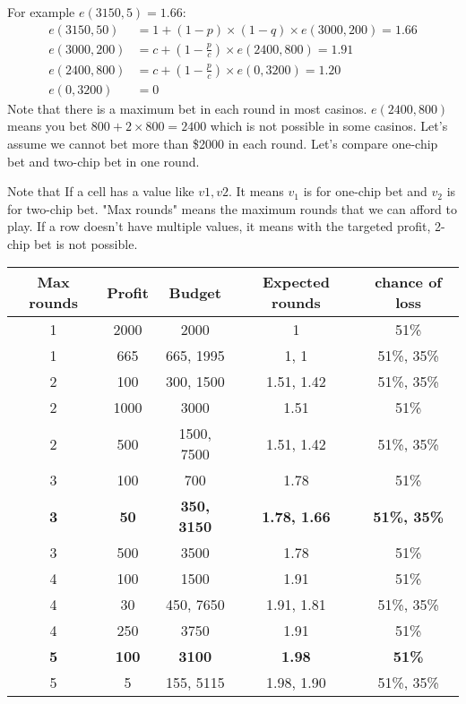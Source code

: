 \documentclass{book}
\begin{document}
	For example $e(3150, 5) = 1.66$:
	\begin{equation*}
		\begin{split}
			e(3150, 50) &= 1 + (1 - p) \times (1 - q) \times e(3000, 200) = 1.66 \\
			e(3000, 200) &= c + (1 - \frac{p}{c}) \times e(2400, 800) = 1.91 \\
			e(2400, 800) &= c + (1 - \frac{p}{c}) \times e(0, 3200) = 1.20 \\
			e(0, 3200) &= 0
		\end{split}
	\end{equation*}
	Note that there is a maximum bet in each round in most casinos. $e(2400, 800)$ means you bet $800 + 2 \times 800 = 2400$ which is not possible in some casinos. Let's assume we cannot bet more than \$2000 in each round. Let's compare one-chip bet and two-chip bet in one round.
	\par Note that If a cell has a value like $v1, v2$. It means $v_1$ is for one-chip bet and $v_2$ is for two-chip bet. "Max rounds" means the maximum rounds that we can afford to play. If a row doesn't have multiple values, it means with the targeted profit, 2-chip bet is not possible. \\
	\begin{tabular}[h!]{c c c c c}
		\toprule
		Max rounds & Profit & Budget & Expected rounds & chance of loss \\
		\midrule
		1 & 2000 & 2000 & 1 & 51\% \\
		1 & 665 & 665, 1995 & 1, 1 & 51\%, 35\% \\
		2 & 100 & 300, 1500 & 1.51, 1.42 & 51\%, 35\% \\
		2 & 1000 & 3000 & 1.51 & 51\% \\
		2 & 500 & 1500, 7500 & 1.51, 1.42 & 51\%, 35\% \\
		3 & 100 & 700 & 1.78 & 51\% \\
		\textbf{3} & \textbf{50} & \textbf{350, 3150} & \textbf{1.78, 1.66} & \textbf{51\%, 35\%} \\
		3 & 500 & 3500 & 1.78 & 51\% \\
		4 & 100 & 1500 & 1.91 & 51\% \\
		4 & 30 & 450, 7650 & 1.91, 1.81 & 51\%, 35\% \\
		4 & 250 & 3750 & 1.91 & 51\% \\
		\textbf{5} & \textbf{100} & \textbf{3100} & \textbf{1.98} & \textbf{51\%} \\
		5 & 5 & 155, 5115 & 1.98, 1.90 & 51\%, 35\% \\		
		\bottomrule
	\end{tabular} \\
\end{document}

